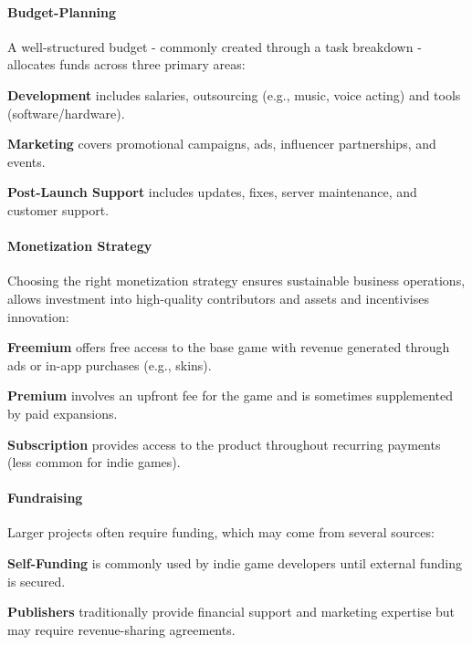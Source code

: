 \paragraph{Budget-Planning} A well-structured budget - commonly created through a task breakdown\cite{linkedin_budget} - allocates funds across three primary areas:

 \textbf{Development} includes salaries, outsourcing (e.g., music, voice acting) and tools (software/hardware).\cite{eduonix_costs}

 \textbf{Marketing} covers promotional campaigns, ads, influencer partnerships, and events.\cite{eduonix_costs}

 \textbf{Post-Launch Support} includes updates, fixes, server maintenance, and customer support.\cite{eduonix_costs}

\paragraph{Monetization Strategy} Choosing the right monetization strategy ensures sustainable business operations, allows investment into high-quality contributors and assets and incentivises innovation:

 \textbf{Freemium} offers free access to the base game with revenue generated through ads or in-app purchases (e.g., skins).\cite{hubka_game-monetization}

 \textbf{Premium} involves an upfront fee for the game and is sometimes supplemented by paid expansions.\cite{hubka_game-monetization}

 \textbf{Subscription} provides access to the product throughout recurring payments (less common for indie games).\cite{hubka_game-monetization}

\paragraph{Fundraising} Larger projects often require funding, which may come from several sources:

 \textbf{Self-Funding} is commonly used by indie game developers until external funding is secured.\cite{perforce-stoftware_tips}

 \textbf{Publishers} traditionally provide financial support and marketing expertise but may require revenue-sharing agreements.\cite{perforce-stoftware_tips}


